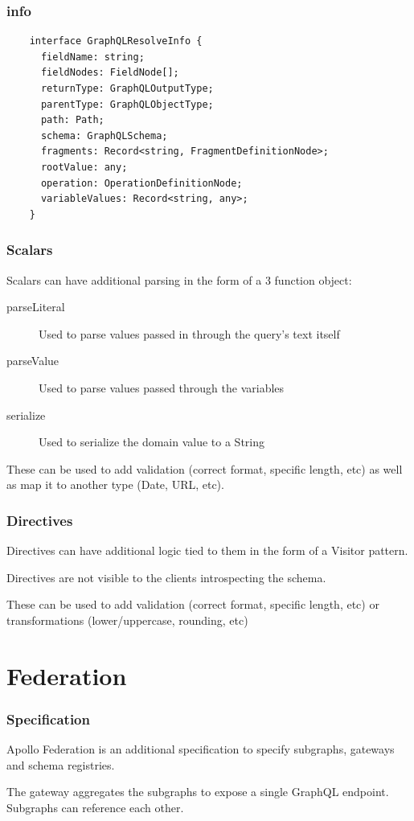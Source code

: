 \documentclass{beamer}
\begin{document}
\begin{frame}[fragile]
  \frametitle{info}
  \begin{verbatim}
    interface GraphQLResolveInfo {
      fieldName: string;
      fieldNodes: FieldNode[];
      returnType: GraphQLOutputType;
      parentType: GraphQLObjectType;
      path: Path;
      schema: GraphQLSchema;
      fragments: Record<string, FragmentDefinitionNode>;
      rootValue: any;
      operation: OperationDefinitionNode;
      variableValues: Record<string, any>;
    }
  \end{verbatim}
\end{frame}


\begin{frame}
  \frametitle{Scalars}
  Scalars can have additional parsing in the form of a 3 function object:

  \begin{description}
  \item[parseLiteral] Used to parse values passed in through the query's text itself
  \item[parseValue] Used to parse values passed through the variables
  \item[serialize] Used to serialize the domain value to a String
  \end{description}

  \vspace{1em}
  These can be used to add validation (correct format, specific length, etc) as well as map it to another type (Date, URL, etc).
\end{frame}

\begin{frame}
  \frametitle{Directives} Directives can have additional logic tied to them in the form of a Visitor pattern.

  \vspace{1em}
  Directives are not visible to the clients introspecting the schema.

  \vspace{1em}
  These can be used to add validation (correct format, specific length, etc) or transformations (lower/uppercase, rounding, etc)
\end{frame}

\section{Federation}
\begin{frame}
  \frametitle{Specification}
  Apollo Federation is an additional specification to specify subgraphs, gateways and schema registries.

  \vspace{1em}
  The gateway aggregates the subgraphs to expose a single GraphQL endpoint. Subgraphs can reference each other.
\end{frame}
\end{document}
